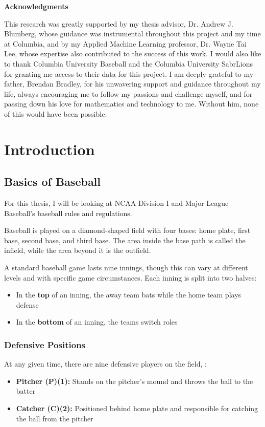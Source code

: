 \documentclass{article}
\begin{document}
\newpage
{}
\begin{center}
    \textbf{\large Acknowledgments}
\end{center}
 This research was greatly supported by my thesis advisor, Dr. Andrew J. Blumberg, whose guidance was instrumental throughout this project and my time at Columbia, and by my Applied Machine Learning professor, Dr. Wayne Tai Lee, whose expertise also contributed to the success of this work. I would also like to thank Columbia University Baseball and the Columbia University SabrLions for granting me access to their data for this project. I am deeply grateful to my father, Brendan Bradley, for his unwavering support and guidance throughout my life, always encouraging me to follow my passions and challenge myself, and for passing down his love for mathematics and technology to me. Without him, none of this would have been possible.


\newpage
{}
\tableofcontents

\newpage
{}
\section{Introduction}
\subsection{Basics of Baseball}
For this thesis, I will be looking at NCAA Division I \cite{ncaa2023baseballrules} and Major League Baseball's  \cite{mlb2025officialrules} baseball rules and regulations.

Baseball is played on a diamond-shaped field with four bases: home plate, first base, second base, and third base. The area inside the base path is called the infield, while the area beyond it is the outfield. 

A standard baseball game lasts nine innings, though this can vary at different levels and with specific game circumstances. Each inning is split into two halves:

\begin{itemize}
    \item In the \textbf{top} of an inning, the away team bats while the home team plays defense
    \item In the \textbf{bottom} of an inning, the teams switch roles 
\end{itemize}

\subsubsection{Defensive Positions} 
At any given time, there are nine defensive players on the field, \cite{wikipedia2023baseballpositions}:
\begin{itemize}
    \item \textbf{Pitcher (P)(1):} Stands on the pitcher's mound and throws the ball to the batter
    \item \textbf{Catcher (C)(2):} Positioned behind home plate and responsible for catching the ball from the pitcher
\end{itemize}
\end{document}
